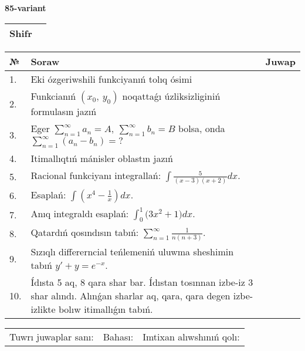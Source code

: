 \documentclass{article}
\begin{document}
  \egroup
  
  \newpage
  
  
  \textbf{85-variant}\\
  
  \bgroup
  \def\arraystretch{1.6} %
  
  \begin{tabular}{|m{5.7cm}|m{9.5cm}|}
  \hline
  Shifr & \\
  \hline
  \end{tabular}
  
  \vspace{1cm}
  
  \begin{tabular}{|m{0.7cm}|m{10cm}|m{4cm}|}
  \hline
  № & Soraw & Juwap \\
  \hline
  1. & Eki ózgeriwshili funkciyanıń tolıq ósimi &  \\
  \hline
  2. & Funkcianıń \((x_{0},\ y_{0})\) noqattaǵı úzliksizliginiń formulasın jazıń &  \\
  \hline
  3. & Eger \(\sum_{n = 1}^{\infty}a_{n} = A,\ \sum_{n = 1}^{\infty}b_{n} = B\) bolsa, onda \(\sum_{n = 1}^{\infty}\left( a_{n} - b_{n} \right) = ?\) &  \\
  \hline
  4. & Itimallıqtıń mánisler oblastın jazıń &  \\
  \hline
  5. & Racional funkciyanı integrallań: \(\int{\frac{5}{(x - 3)(x + 2)}dx}\). &  \\
  \hline
  6. & Esaplań: \(\int\left( x^{4} - \frac{1}{x} \right)dx\). &  \\
  \hline
  7. & Anıq integraldı esaplań: \(\int_{0}^{1}{(3x^2 } + 1)dx\). &  \\
  \hline
  8. & Qatardıń qosındısın tabıń: \(\sum_{n = 1}^{\infty}\frac{1}{n(n + 3)}\). &  \\
  \hline
  9. & Sızıqlı differerncial teńlemeniń uluwma sheshimin tabıń \(y' + y = e^{- x}\). &  \\
  \hline
  10. & Ídısta 5 aq, 8 qara shar bar. Ídıstan tosınnan izbe-iz 3 shar alındı. Alınǵan sharlar aq, qara, qara degen izbe-izlikte bolıw itimallıǵın tabıń. &  \\
  \hline
  \end{tabular}
  
  \vspace{1cm}
  
  \begin{tabular}{lll}
  Tuwrı juwaplar sanı: \underline{\hspace{1.5cm}} & 
  Bahası: \underline{\hspace{1.5cm}} & 
  Imtixan alıwshınıń qolı: \underline{\hspace{2cm}} \\
  \end{tabular}
  
\end{document}
